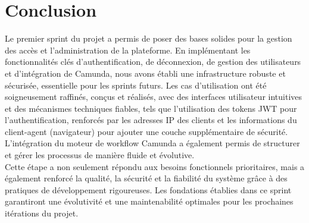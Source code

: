 \section{Conclusion}

Le premier sprint du projet a permis de poser des bases solides pour la gestion des accès et l'administration de la plateforme. En implémentant les fonctionnalités clés d'authentification, de déconnexion, de gestion des utilisateurs et d'intégration de Camunda, nous avons établi une infrastructure robuste et sécurisée, essentielle pour les sprints futurs. Les cas d'utilisation ont été soigneusement raffinés, conçus et réalisés, avec des interfaces utilisateur intuitives et des mécanismes techniques fiables, tels que l'utilisation des tokens JWT pour l'authentification, renforcés par les adresses IP des clients et les informations du client-agent (navigateur) pour ajouter une couche supplémentaire de sécurité. L'intégration du moteur de workflow Camunda a également permis de structurer et gérer les processus de manière fluide et évolutive.\\

Cette étape a non seulement répondu aux besoins fonctionnels prioritaires, mais a également renforcé la qualité, la sécurité et la fiabilité du système grâce à des pratiques de développement rigoureuses. Les fondations établies dans ce sprint garantiront une évolutivité et une maintenabilité optimales pour les prochaines itérations du projet.







 


 


 

